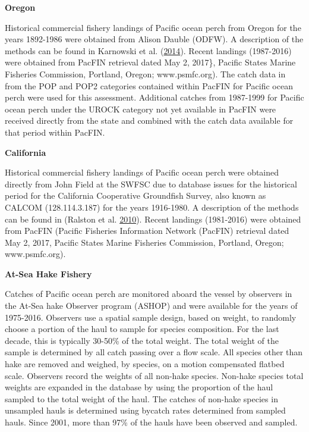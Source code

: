 \documentclass[12pt,]{article}
\begin{document}
\textbf{Oregon}

Historical commercial fishery landings of Pacific ocean perch from
Oregon for the years 1892-1986 were obtained from Alison Dauble (ODFW).
A description of the methods can be found in Karnowski et al.
(\protect\hyperlink{ref-karnowski_historical_2014}{2014}). Recent
landings (1987-2016) were obtained from PacFIN retrieval dated May 2,
2017\}, Pacific States Marine Fisheries Commission, Portland, Oregon;
www.psmfc.org). The catch data in from the POP and POP2 categories
contained within PacFIN for Pacific ocean perch were used for this
assessment. Additional catches from 1987-1999 for Pacific ocean perch
under the UROCK category not yet available in PacFIN were received
directly from the state and combined with the catch data available for
that period within PacFIN.

\textbf{California}

Historical commercial fishery landings of Pacific ocean perch were
obtained directly from John Field at the SWFSC due to database issues
for the historical period for the California Cooperative Groundfish
Survey, also known as CALCOM (128.114.3.187) for the years 1916-1980. A
description of the methods can be found in (Ralston et al.
\protect\hyperlink{ref-ralston_documentation_2010}{2010}). Recent
landings (1981-2016) were obtained from PacFIN (Pacific Fisheries
Information Network (PacFIN) retrieval dated May 2, 2017, Pacific States
Marine Fisheries Commission, Portland, Oregon; www.psmfc.org).

\textbf{At-Sea Hake Fishery}

Catches of Pacific ocean perch are monitored aboard the vessel by
observers in the At-Sea hake Observer program (ASHOP) and were available
for the years of 1975-2016. Observers use a spatial sample design, based
on weight, to randomly choose a portion of the haul to sample for
species composition. For the last decade, this is typically 30-50\% of
the total weight. The total weight of the sample is determined by all
catch passing over a flow scale. All species other than hake are removed
and weighed, by species, on a motion compensated flatbed scale.
Observers record the weights of all non-hake species. Non-hake species
total weights are expanded in the database by using the proportion of
the haul sampled to the total weight of the haul. The catches of
non-hake species in unsampled hauls is determined using bycatch rates
determined from sampled hauls. Since 2001, more than 97\% of the hauls
have been observed and sampled.
\end{document}
